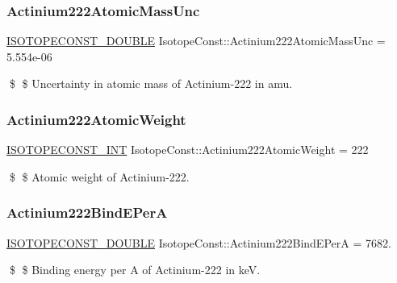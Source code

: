 \subsubsection{\texorpdfstring{Actinium222\+Atomic\+Mass\+Unc}{Actinium222AtomicMassUnc}}
{\footnotesize\ttfamily \mbox{\hyperlink{group___isotope_const-_macros_ga8f45a7272ce02c0b4c65c44636ed719a}{I\+S\+O\+T\+O\+P\+E\+C\+O\+N\+S\+T\+\_\+\+D\+O\+U\+B\+LE}} Isotope\+Const\+::\+Actinium222\+Atomic\+Mass\+Unc = 5.\+554e-\/06}

\$ \$ Uncertainty in atomic mass of Actinium-\/222 in amu. \mbox{\label{group___isotope_const-_actinium-_ac222_ga1b3e4ed6634cabfe74b4429b8f76c14b}} 
\subsubsection{\texorpdfstring{Actinium222\+Atomic\+Weight}{Actinium222AtomicWeight}}
{\footnotesize\ttfamily \mbox{\hyperlink{group___isotope_const-_macros_ga5f18360b3e99483a35c32d789e62621c}{I\+S\+O\+T\+O\+P\+E\+C\+O\+N\+S\+T\+\_\+\+I\+NT}} Isotope\+Const\+::\+Actinium222\+Atomic\+Weight = 222}

\$ \$ Atomic weight of Actinium-\/222. \mbox{\label{group___isotope_const-_actinium-_ac222_ga5acdaf0ac8342013f011a0b4596928e3}} 
\subsubsection{\texorpdfstring{Actinium222\+Bind\+E\+PerA}{Actinium222BindEPerA}}
{\footnotesize\ttfamily \mbox{\hyperlink{group___isotope_const-_macros_ga8f45a7272ce02c0b4c65c44636ed719a}{I\+S\+O\+T\+O\+P\+E\+C\+O\+N\+S\+T\+\_\+\+D\+O\+U\+B\+LE}} Isotope\+Const\+::\+Actinium222\+Bind\+E\+PerA = 7682.}

\$ \$ Binding energy per A of Actinium-\/222 in keV. \mbox{\label{group___isotope_const-_actinium-_ac222_ga3478d09e80a5c8eec554208d4afb40cb}} 
